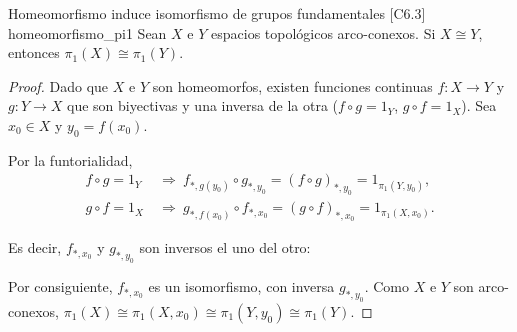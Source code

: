 \begin{proposicion}{Homeomorfismo induce isomorfismo de grupos fundamentales [C6.3] \marcaC}{homeomorfismo_pi1}
Sean $X$ e $Y$ espacios topológicos arco-conexos. Si $X \cong Y$, entonces $\pi_1(X) \cong \pi_1(Y)$.

\begin{proof}
Dado que $X$ e $Y$ son homeomorfos, existen funciones continuas $f \colon X \longrightarrow Y$ y $g \colon Y \longrightarrow X$ que son biyectivas y una inversa de la otra ($f \circ g = 1_Y$, $g \circ f = 1_X$). Sea $x_0 \in X$ y $y_0 = f(x_0)$.

Por la funtorialidad,
\begin{align*}
f \circ g = 1_Y &\ \Rightarrow\ f_{*, g(y_0)} \circ g_{*, y_0} = (f \circ g)_{*, y_0} = 1_{\pi_1(Y, y_0)}, \\
g \circ f = 1_X &\ \Rightarrow\ g_{*, f(x_0)} \circ f_{*, x_0} = (g \circ f)_{*, x_0} = 1_{\pi_1(X, x_0)}.
\end{align*}

Es decir, $f_{*,x_0}$ y $g_{*,y_0}$ son inversos el uno del otro:

\begin{center}
\end{center}
Por consiguiente, $f_{*,x_0}$ es un isomorfismo, con inversa $g_{*,y_0}$. Como $X$ e $Y$ son arco-conexos, $\pi_1(X) \cong \pi_1(X,x_0) \cong \pi_1(Y,y_0) \cong \pi_1(Y)$.
\end{proof}
\end{proposicion}

